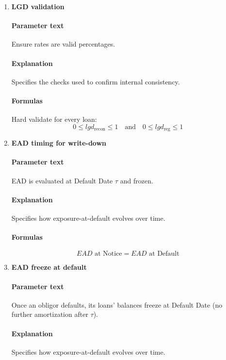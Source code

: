 \documentclass[11pt]{article}
\begin{document}
\begin{enumerate}[label=\arabic*),leftmargin=*,align=left]
\paragraph{Explanation} Defines a required parameter or rule that must be implemented exactly as stated.

\item \textbf{LGD validation}
\paragraph{Parameter text} Ensure rates are valid percentages.
\paragraph{Explanation} Specifies the checks used to confirm internal consistency.
\paragraph{Formulas} Hard validate for every loan: 
\[ 0 \le lgd_{\text{recon}} \le 1 \quad \text{and} \quad 0 \le lgd_{\text{reg}} \le 1 \]

\item \textbf{EAD timing for write-down}
\paragraph{Parameter text} EAD is evaluated at Default Date $\tau$ and frozen.
\paragraph{Explanation} Specifies how exposure-at-default evolves over time.
\paragraph{Formulas} 
\[ EAD \text{ at Notice} = EAD \text{ at Default} \]

\item \textbf{EAD freeze at default}
\paragraph{Parameter text} Once an obligor defaults, its loans’ balances freeze at Default Date (no further amortization after $\tau$).
\paragraph{Explanation} Specifies how exposure-at-default evolves over time.


\end{enumerate}
\end{document}
